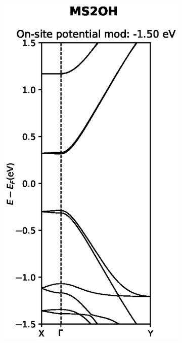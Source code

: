 \begin{figure}[h]
\begin{subfigure}[b]{0.3\textwidth}
		\includegraphics[width=\textwidth]{Figures/MS2OHmod1.eps}
		\vspace{-2.5\baselineskip}
		\caption{}
		\label{MS2OHmod1}
	\end{subfigure}
	~
	\begin{subfigure}[b]{0.3\textwidth}
		\centering

\end{subfigure}
\end{figure}

